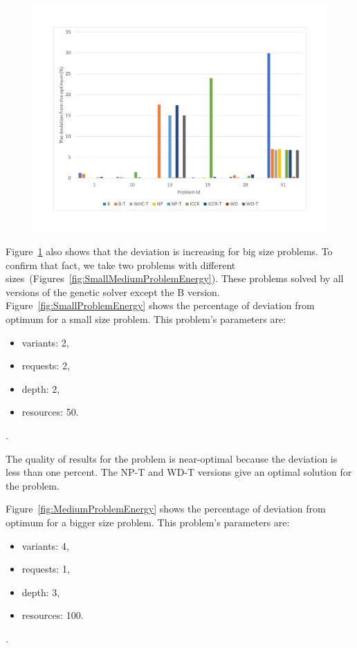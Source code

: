 \begin{figure}
	\centering
	\includegraphics[width=\textwidth]{images/EnergyPercentage.pdf}
	\caption[]{}
	\label{fig:EnergyPercentage}
\end{figure}

Figure~\ref{fig:EnergyPercentage} also shows that the deviation is increasing for big size problems. To confirm that fact, we take two problems with different sizes~(Figures~\ref{fig:SmallMediumProblemEnergy}). These problems solved by all versions of the genetic solver except the B version. Figure~\ref{fig:SmallProblemEnergy} shows the percentage of deviation from optimum for a small size problem. This problem's parameters are:
\begin{itemize}
	\item variants: 2,
	\item requests: 2,
	\item depth: 2,
	\item resources: 50.
\end{itemize}.

The quality of results for the problem is near-optimal because the deviation is less than one percent. The NP-T and WD-T versions give an optimal solution for the problem.

Figure~\ref{fig:MediumProblemEnergy} shows the percentage of deviation from optimum for a bigger size problem. This problem's parameters are:
\begin{itemize}
	\item variants: 4,
	\item requests: 1,
	\item depth: 3,
	\item resources: 100.
\end{itemize}.

